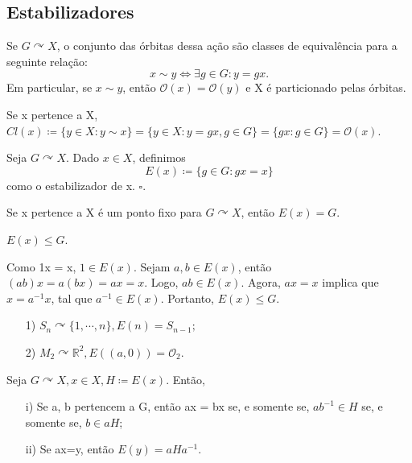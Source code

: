 \documentclass[algebra_notes.tex]{subfiles}
\begin{document}
\subsection{Estabilizadores}
\begin{prop*}
	Se \(G \curvearrowright X\), o conjunto das órbitas dessa ação são classes de equivalência para a seguinte relação:
	\[
		x\sim y \Longleftrightarrow \exists g\in G: y = gx.
	\]
	Em particular, se \(x\sim y\), então \(\mathcal{O}(x) = \mathcal{O}(y)\) e X é particionado pelas órbitas.
\end{prop*}
\begin{proof*}
	Se x pertence a X, \(Cl(x)\coloneqq \{y\in X: y\sim x\} = \{y\in X: y=gx, g\in G\} = \{gx: g\in G\}= \mathcal{O}(x)\). \qedsymbol
\end{proof*}
\begin{def*}
	Seja \(G \curvearrowright X\). Dado \(x\in X\), definimos
	\[
		E(x)\coloneqq \{g\in G: gx = x\}
	\]
	como o estabilizador de x. \(\square\).
\end{def*}
\begin{example*}
	Se x pertence a X é um ponto fixo para \(G \curvearrowright X\), então \(E(x) = G.\)
\end{example*}
\begin{prop*}
	\(E(x)\leq G\).
\end{prop*}
\begin{proof*}
	Como 1x = x, \(1\in E(x)\). Sejam \(a, b\in E(x)\), então \((ab)x = a(bx) = ax = x\). Logo, \(ab\in E(x)\). Agora, \(ax = x \) implica que \( x = a^{-1}x \),
	tal que \(a^{-1}\in E(x)\). Portanto, \(E(x)\leq G.\) \qedsymbol
\end{proof*}
\begin{example*}
	\begin{itemize}
		\item[1)] \(S_{n} \curvearrowright \{1, \cdots, n\}, E(n) = S_{n-1};\)
		\item[2)] \(M_{2} \curvearrowright \mathbb{R}^{2}, E((a, 0)) = \mathcal{O}_{2}.\)
	\end{itemize}
\end{example*}
\begin{prop*}
	Seja \(G \curvearrowright X, x\in X, H\coloneqq E(x)\). Então,
	\begin{itemize}
		\item[i)] Se a, b pertencem a G, então ax = bx se, e somente se, \(ab^{-1}\in H\) se, e somente se, \(b\in aH\);
		\item[ii)] Se ax=y, então \(E(y) = aHa^{-1}\).
	\end{itemize}
\end{prop*}
\end{document}
